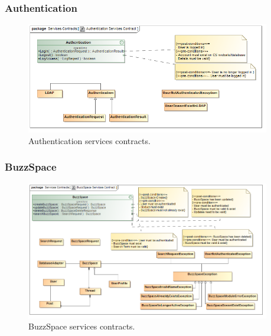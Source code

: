 \documentclass [a4paper,12pt] {article}
\begin{document}
		\subsubsection{Authentication}
			\begin{figure}[H]
						\centering
						\includegraphics[width=0.95\textwidth]{AuthenticationSC.png}
						\caption{Authentication services contracts.}
			\end{figure}
		\subsubsection{BuzzSpace}
					\begin{figure}[H]
						\centering
						\includegraphics[width=0.95\textwidth]{BuzzSpaceSC.png}
						\caption{BuzzSpace services contracts.}
					\end{figure}
					
\end{document}
